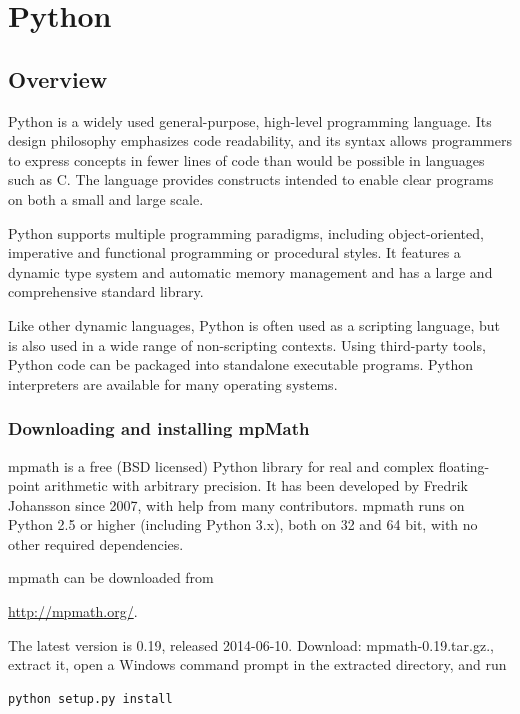 
\chapter{Python} 

\section{Overview}
Python is a widely used general-purpose, high-level programming language. Its design philosophy emphasizes code readability, and its syntax allows programmers to express concepts in fewer lines of code than would be possible in languages such as C. The language provides constructs intended to enable clear programs on both a small and large scale.

\vpara
Python supports multiple programming paradigms, including object-oriented, imperative and functional programming or procedural styles. It features a dynamic type system and automatic memory management and has a large and comprehensive standard library.

\vpara
Like other dynamic languages, Python is often used as a scripting language, but is also used in a wide range of non-scripting contexts. Using third-party tools, Python code can be packaged into standalone executable programs. Python interpreters are available for many operating systems.





\subsection{Downloading and installing mpMath}

mpmath is a free (BSD licensed) Python library for real and complex floating-point arithmetic with arbitrary precision. It has been developed by Fredrik Johansson since 2007, with help from many contributors. mpmath runs on Python 2.5 or higher (including Python 3.x), both on 32 and 64 bit, with no other required dependencies.

mpmath can be downloaded from

\vpara
\href{http://mpmath.org/}{http://mpmath.org/}.

The latest version is 0.19, released 2014-06-10. Download: mpmath-0.19.tar.gz., extract it, open a Windows command prompt in the extracted directory, and run
\begin{verbatim}
python setup.py install
\end{verbatim}


